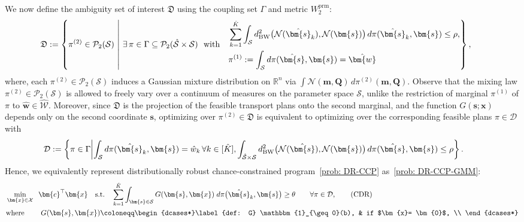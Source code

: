 \documentclass[opre,sglanonrev]{informs4}
\newcommand{\mD}{\mathcal{D}}
\newcommand{\mS}{\mathcal{S}}
\newcommand{\mN}{\mathcal{N}}
\newcommand{\mX}{\mathcal{X}}
\newcommand{\mW}{\mathcal{W}}
\newcommand{\mP}{\mathcal{P}}
\newcommand{\mfD}{\mathfrak{D}}
\newcommand{\mbR}{\mathbb R}
\newcommand{\bzero}{\bm{0}}
\newcommand{\bmean}{\bm{m}}
\newcommand{\bc}{\bm{c}}
\newcommand{\bs}{\bm{s}}
\newcommand{\bw}{\bm{w}}
\newcommand{\bx}{\bm{x}}
\newcommand{\bQ}{\bm Q}
\begin{document}
{We now define the ambiguity set of interest $\mfD$ using the coupling set $\Gamma$ and  metric $W^\mathrm{prm}_2$:
\begin{equation}\label{eq: W-type-ambiguity}
\hspace{-1.5em}\mathfrak{D}
:=\left\{\pi^{(2)} \in \mathcal P_2(\mS) \ \middle|\ 
\exists\,\pi \in \Gamma\subseteq \mP_2(\hat{\mS} \times \mS)\ \,\, \text{with}\quad
\begin{aligned}
& \sum_{k=1}^{\hat{K}} \int_{\mS} d^2_{\mathrm{BW}} \bigl(\mN(\hat{\bs}_k),  \mN(\bs) \bigr)\, d\pi(\hat{\bs}_k, \bs) \leq \rho, \\
& \pi^{(1)} := \int_{\mS} d\pi(\hat{\bs}, \bs) = \hat{\bm{w}}
\end{aligned}
\right\}, 
\end{equation}
where, each $\pi^{(2)}\in\mathcal P_2(\mS)$ induces a Gaussian mixture distribution on $\mbR^n$ via $\int \mN(\bmean,\bQ)\,d\pi^{(2)}(\bmean,\bQ)$. Observe that the mixing law $\pi^{(2)}\in\mathcal P_2(\mS)$ is allowed to freely vary over a continuum of measures on the parameter space $\mS$, unlike the restriction of marginal $\pi^{(1)}$ of $\pi$ to $\hat{\bw} \in \hat{\mW}$. Moreover, since \(\mathfrak D\) is the projection of the feasible transport plans onto the second marginal, and the function \(G(\bs;\bx)\) depends only on the second
coordinate \(\bs\), optimizing over \(\pi^{(2)}\in\mathfrak D\) is equivalent to
optimizing over the corresponding feasible plans \(\pi\in\mD\) with
\begin{align}
\hspace{-2em}    \mD:=\left\{\pi\in \Gamma \middle|  \int_{\mS} d\pi(\hat{\bs}_k, \bs) = \hat{w}_k \,\forall k \in [\hat{K}],
\int_{\hat{\mS}\times\mS}d^2_{\mathrm{BW}}\bigl(\mN(\hat{\bs}),\mN(\bs)\bigr)\,d\pi(\hat{\bs},\bs)\le \rho\right\}.\label{def: M-Wass-Ambiguity-Cont}
\end{align}
Hence, we equivalently represent distributionally robust chance-constrained program~\eqref{prob: DR-CCP} as~\eqref{prob: DR-CCP-GMM}: 
\begin{align}
 & \min_{\bx \in \mX} \;\; \bc^\top \bx \quad \mathrm{s.t.} \quad \sum_{k=1}^{\hat{K}} \int_{\bs \in \mS} G(\bs, \bx) \; d\pi \bigl(\hat{\bs}_k, \bs\bigr) \geq \theta \qquad \forall \pi \in \mD,  \label{prob: DR-CCP-GMM} \tag{CDR}  \\
&  \text{where}  \qquad  \; G(\bs, \bx) \coloneqq
    \begin{dcases*}\label{def: G}
        \mathbbm{1}_{\geq 0}(b), & if $\bx = \bzero$, \\

\end{dcases*}
\end{align}}
\end{document}
